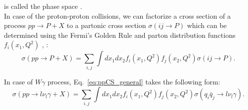 is called the phase space \cite{ref_Peskin}.\\



In case of the proton-proton collisions, we can factorize a cross section of a process $pp \rightarrow P+X$ to a partonic cross section $\sigma(ij \rightarrow P)$ which can be determined using the Fermi's Golden Rule and parton distribution functions $f_i(x_1,Q^2)$ \cite{ref_PDG}, \cite{ref_Lindsey_thesis}:\\


\begin{equation}\label{eq:ppCS_general}
  \sigma(pp \rightarrow P+X)= \sum_{i,j} \int dx_1 dx_2 f_i(x_1,Q^2) f_j(x_2, Q^2) \sigma(ij \rightarrow P).
\end{equation}


In case of $W\gamma$ process, Eq.~\ref{eq:ppCS_general} takes the following form: \\

\begin{equation}\label{eq:ppCS_Wg}
  \sigma(pp \rightarrow l \nu_l \gamma + X)= \sum_{i,j} \int dx_1 dx_2 f_i(x_1,Q^2) f_j(x_2, Q^2) \sigma(q_i \bar{q}_j \rightarrow l \nu_l \gamma).
\end{equation}
